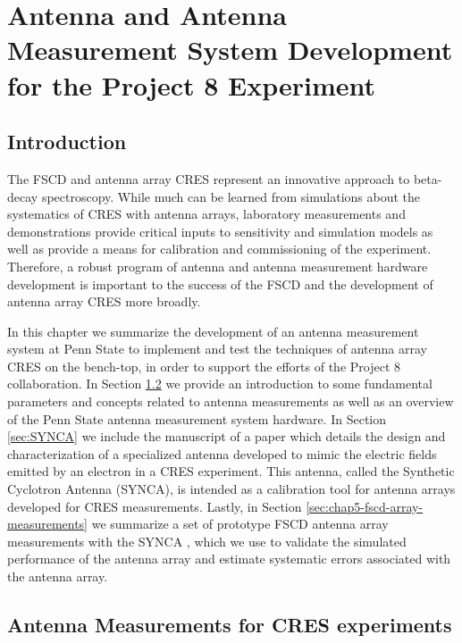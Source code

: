 

\chapter{Antenna and Antenna Measurement System Development for the Project 8 Experiment}

\section{Introduction}

The FSCD and antenna array CRES represent an innovative approach to beta-decay spectroscopy. While much can be learned from simulations about the systematics of CRES with antenna arrays, laboratory measurements and demonstrations provide critical inputs to sensitivity and simulation models as well as provide a means for calibration and commissioning of the experiment. Therefore, a robust program of antenna and antenna measurement hardware development is important to the success of the FSCD and the development of antenna array CRES more broadly.

In this chapter we summarize the development of an antenna measurement system at Penn State to implement and test the techniques of antenna array CRES on the bench-top, in order to support the efforts of the Project 8 collaboration. In Section \ref{sec:chap4-ant-meas} we provide an introduction to some fundamental parameters and concepts related to antenna measurements as well as an overview of the Penn State antenna measurement system hardware. In Section \ref{sec:SYNCA} we include the manuscript of a paper \cite{p8synca} which details the design and characterization of a specialized antenna developed to mimic the electric fields emitted by an electron in a CRES experiment. This antenna, called the Synthetic Cyclotron Antenna (SYNCA), is intended as a calibration tool for antenna arrays developed for CRES measurements. Lastly, in Section \ref{sec:chap5-fscd-array-measurements} we summarize a set of prototype FSCD antenna array measurements with the SYNCA \cite{p8jugaad}, which we use to validate the simulated performance of the antenna array and estimate systematic errors associated with the antenna array.

\section{Antenna Measurements for CRES experiments}
\label{sec:chap4-ant-meas}

